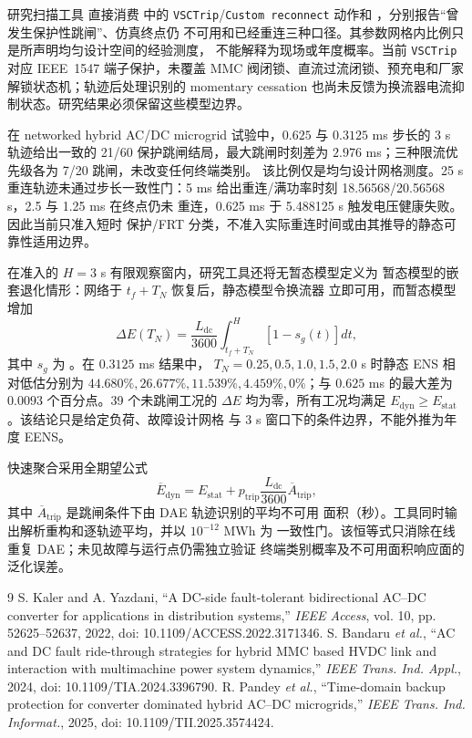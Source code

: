 研究扫描工具  直接消费
 中的 \texttt{VSCTrip}/\texttt{Custom reconnect}
动作和 ，分别报告“曾发生保护性跳闸”、仿真终点仍
不可用和已经重连三种口径。其参数网格内比例只是所声明均匀设计空间的经验测度，
不能解释为现场或年度概率。当前 \texttt{VSCTrip} 对应 IEEE~1547 端子保护，未覆盖
MMC 阀闭锁、直流过流闭锁、预充电和厂家解锁状态机；轨迹后处理识别的 momentary
cessation 也尚未反馈为换流器电流抑制状态。研究结果必须保留这些模型边界。

在 networked hybrid AC/DC microgrid 试验中，$0.625$ 与 $0.3125$ ms
步长的 3 s 轨迹给出一致的 21/60 保护跳闸结局，最大跳闸时刻差为
$2.976$ ms；三种限流优先级各为 7/20 跳闸，未改变任何终端类别。
该比例仅是均匀设计网格测度。25 s 重连轨迹未通过步长一致性门：5 ms
给出重连/满功率时刻 18.56568/20.56568 s，2.5 与 1.25 ms 在终点仍未
重连，0.625 ms 于 5.488125 s 触发电压健康失败。因此当前只准入短时
保护/FRT 分类，不准入实际重连时间或由其推导的静态可靠性适用边界。

在准入的 $H=3$ s 有限观察窗内，研究工具还将无暂态模型定义为
暂态模型的嵌套退化情形：网络于 $t_f+T_N$ 恢复后，静态模型令换流器
立即可用，而暂态模型增加
\[
 \Delta E(T_N)=\frac{L_{\mathrm{dc}}}{3600}
 \int_{t_f+T_N}^{H}\left[1-s_g(t)\right]dt,
\]
其中 $s_g$ 为 。在 $0.3125$ ms 结果中，
$T_N=0.25,0.5,1.0,1.5,2.0$ s 时静态 ENS 相对低估分别为
$44.680\%,26.677\%,11.539\%,4.459\%,0\%$；与 $0.625$ ms 的最大差为
$0.0093$ 个百分点。39 个未跳闸工况的 $\Delta E$ 均为零，所有工况均满足
$E_{\mathrm{dyn}}\ge E_{\mathrm{stat}}$。该结论只是给定负荷、故障设计网格
与 3 s 窗口下的条件边界，不能外推为年度 EENS。

快速聚合采用全期望公式
\[
 \overline E_{\mathrm{dyn}}=E_{\mathrm{stat}}+
 p_{\mathrm{trip}}\frac{L_{\mathrm{dc}}}{3600}
 \overline A_{\mathrm{trip}},
\]
其中 $\overline A_{\mathrm{trip}}$ 是跳闸条件下由 DAE 轨迹识别的平均不可用
面积（秒）。工具同时输出解析重构和逐轨迹平均，并以 $10^{-12}$ MWh 为
一致性门。该恒等式只消除在线重复 DAE；未见故障与运行点仍需独立验证
终端类别概率及不可用面积响应面的泛化误差。

\begin{thebibliography}{9}\small
{} S. Kaler and A. Yazdani, ``A DC-side fault-tolerant
 bidirectional AC--DC converter for applications in distribution systems,''
 \emph{IEEE Access}, vol. 10, pp. 52625--52637, 2022,
 doi: 10.1109/ACCESS.2022.3171346.
 S. Bandaru \emph{et al.}, ``AC and DC fault
 ride-through strategies for hybrid MMC based HVDC link and interaction with
 multimachine power system dynamics,'' \emph{IEEE Trans. Ind. Appl.}, 2024,
 doi: 10.1109/TIA.2024.3396790.
 R. Pandey \emph{et al.}, ``Time-domain backup
 protection for converter dominated hybrid AC--DC microgrids,''
 \emph{IEEE Trans. Ind. Informat.}, 2025, doi: 10.1109/TII.2025.3574424.
\end{thebibliography}
